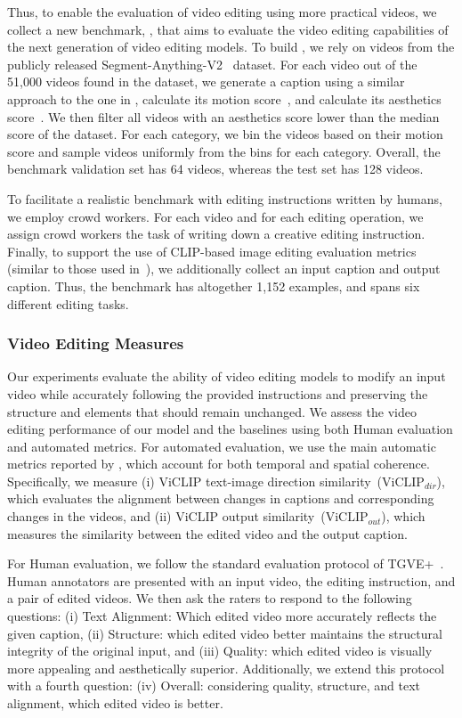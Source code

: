 Thus, to enable the evaluation of video editing using more practical videos, we collect a new benchmark, \OursVideoEditBench, that aims to evaluate the video editing capabilities of the next generation of video editing models.
To build \OursVideoEditBench, we rely on videos from the publicly released Segment-Anything-V2~\citep{ravi2024sam2} dataset.
For each video out of the 51,000 videos found in the dataset, we generate a caption using a similar approach to the one in , calculate its motion score~\citep{motion,opencv_library}, and calculate its aesthetics score~\citep{schuhmann2022laion}.
We then filter all videos with an aesthetics score lower than the median score of the dataset.
For each category, we bin the videos based on their motion score and sample videos uniformly from the bins for each category.
Overall, the benchmark validation set has 64 videos, whereas the test set has 128 videos.

To facilitate a realistic benchmark with editing instructions written by humans, we employ crowd workers.
For each video and for each editing operation, we assign crowd workers the task of writing down a creative editing instruction.
Finally, to support the use of CLIP-based image editing evaluation metrics (similar to those used in~\citep{emuedit}), we additionally collect an input caption and output caption.
Thus, the benchmark has altogether 1,152 examples, and spans six different editing tasks.

\subsubsection{Video Editing Measures}\label{subsubec:edit_measures}
Our experiments evaluate the ability of video editing models to modify an input video while accurately following the provided instructions and preserving the structure and elements that should remain unchanged.
We assess the video editing performance of our model and the baselines using both Human evaluation and automated metrics.
For automated evaluation, we use the main automatic metrics reported by \citep{EVE}, which account for both temporal and spatial coherence.
Specifically, we measure (i) ViCLIP text-image direction similarity~($\text{ViCLIP}_{dir}$), which evaluates the alignment between changes in captions and corresponding changes in the videos, and (ii) ViCLIP output similarity~($\text{ViCLIP}_{out}$), which measures the similarity between the edited video and the output caption.

For Human evaluation, we follow the standard evaluation protocol of TGVE+~\citep{EVE,wu2023cvpr}.
Human annotators are presented with an input video, the editing instruction, and a pair of edited videos.
We then ask the raters to respond to the following questions: (i) Text Alignment: Which edited video more accurately reflects the given caption, (ii) Structure: which edited video better maintains the structural integrity of the original input, and (iii) Quality: which edited video is visually more appealing and aesthetically superior.
Additionally, we extend this protocol with a fourth question: (iv) Overall: considering quality, structure, and text alignment, which edited video is better.

